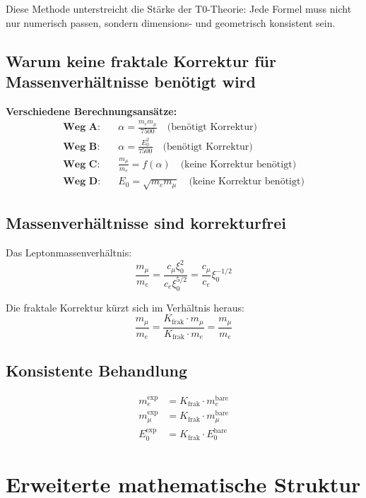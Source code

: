 \documentclass[12pt,a4paper]{article}
\newcommand{\xipar}{\xi_0}
\newcommand{\Kfrak}{K_{\text{frak}}}
\newcommand{\Ezero}{E_0}
\begin{document}
	Diese Methode unterstreicht die Stärke der T0-Theorie: Jede Formel muss nicht nur numerisch passen, sondern dimensions- und geometrisch konsistent sein.	
	\subsection{Warum keine fraktale Korrektur für Massenverhältnisse benötigt wird}
	
	\begin{foundation}
		\textbf{Verschiedene Berechnungsansätze:}
		\begin{align}
			\textbf{Weg A:} &\quad \alpha = \frac{m_e m_\mu}{7500} \quad \text{(benötigt Korrektur)} \\
			\textbf{Weg B:} &\quad \alpha = \frac{\Ezero^2}{7500} \quad \text{(benötigt Korrektur)} \\
			\textbf{Weg C:} &\quad \frac{m_\mu}{m_e} = f(\alpha) \quad \text{(keine Korrektur benötigt)} \\
			\textbf{Weg D:} &\quad \Ezero = \sqrt{m_e m_\mu} \quad \text{(keine Korrektur benötigt)}
		\end{align}
	\end{foundation}
	
	\subsection{Massenverhältnisse sind korrekturfrei}
	
	Das Leptonmassenverhältnis:
	\[
	\frac{m_\mu}{m_e} = \frac{c_\mu \xipar^2}{c_e \xipar^{5/2}} = \frac{c_\mu}{c_e} \xipar^{-1/2}
	\]
	
	Die fraktale Korrektur kürzt sich im Verhältnis heraus:
	\[
	\frac{m_\mu}{m_e} = \frac{\Kfrak \cdot m_\mu}{\Kfrak \cdot m_e} = \frac{m_\mu}{m_e}
	\]
	
	\subsection{Konsistente Behandlung}
	
	\begin{align}
		m_e^{\text{exp}} &= \Kfrak \cdot m_e^{\text{bare}} \\
		m_\mu^{\text{exp}} &= \Kfrak \cdot m_\mu^{\text{bare}} \\
		\Ezero^{\text{exp}} &= \Kfrak \cdot \Ezero^{\text{bare}}
	\end{align}
	
	\section{Erweiterte mathematische Struktur}
	
\end{document}

